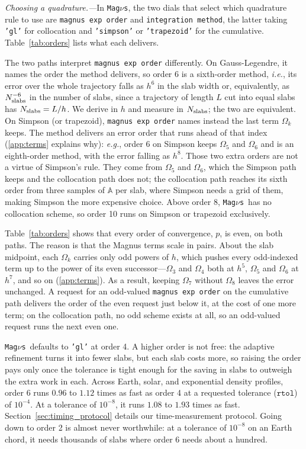 \documentclass[final,5p,times,twocolumn,sort,compress]{elsarticle}
\makeatletter
\newcommand{\ie}{{\it i.e.}}
\newcommand{\eg}{{\it e.g.}}
\DeclareRobustCommand{\_}{%
  \ifmmode\nfss@text{\textunderscore}\else\textunderscore\allowbreak\fi}
\newcommand{\Tab}{Table}
\newcommand{\tabl}[1]{\Tab~\ref{tab:#1}}
\newcommand{\magnus}{{\tt Mag}\ensuremath{\nu}{\tt s}}
\makeatother
\begin{document}
\smallskip

\textit{Choosing a quadrature.---}In \magnus, the two dials that select which quadrature rule to use are {\tt magnus\_exp\_order} and {\tt integration\_method}, the latter taking {\tt 'gl'} for collocation and {\tt 'simpson'} or {\tt 'trapezoid'} for the cumulative. \tabl{orders} lists what each delivers. 

The two paths interpret {\tt magnus\_exp\_order} differently. On Gauss-Legendre, it names the order the method delivers, so order 6 is a sixth-order method, \ie, its error over the whole trajectory falls as $h^{6}$ in the slab width or, equivalently, as $N_{\rm slabs}^{-6}$ in the number of slabs, since a trajectory of length $L$ cut into equal slabs has $N_{\rm slabs} = L/h$. We derive in $h$ and measure in $N_{\rm slabs}$; the two are equivalent. On Simpson (or trapezoid), {\tt magnus\_exp\_order} names instead the last term $\Omega_k$ keeps. The method delivers an error order that runs ahead of that index (\ref{app:terms} explains why): \eg, order 6 on Simpson keeps $\Omega_5$ and $\Omega_6$ and is an eighth-order method, with the error falling as $h^8$. Those two extra orders are not a virtue of Simpson's rule. They come from $\Omega_5$ and $\Omega_6$, which the Simpson path keeps and the collocation path does not; the collocation path reaches its sixth order from three samples of $\mathbb{A}$ per slab, where Simpson needs a grid of them, making Simpson the more expensive choice. Above order 8, \magnus\ has no collocation scheme, so order 10 runs on Simpson or trapezoid exclusively.

\tabl{orders} shows that every order of convergence, $p$, is even, on both paths. The reason is that the Magnus terms scale in pairs. About the slab midpoint, each $\Omega_k$ carries only odd powers of $h$, which pushes every odd-indexed term up to the power of its even successor---$\Omega_3$ and $\Omega_4$ both at $h^{5}$, $\Omega_5$ and $\Omega_6$ at $h^{7}$, and so on (\ref{app:terms}). As a result, keeping $\Omega_7$ without $\Omega_8$ leaves the error unchanged. A request for an odd-valued {\tt magnus\_exp\_order} on the cumulative path delivers the order of the even request just below it, at the cost of one more term; on the collocation path, no odd scheme exists at all, so an odd-valued request runs the next even one.

\magnus\ defaults to {\tt 'gl'} at order 4. A higher order is not free: the adaptive refinement turns it into fewer slabs, but each slab costs more, so raising the order pays only once the tolerance is tight enough for the saving in slabs to outweigh the extra work in each. Across Earth, solar, and exponential density profiles, order 6 runs $0.96$ to $1.12$ times as fast as order 4 at a requested tolerance ($\texttt{rtol}$) of $10^{-4}$. At a tolerance of $10^{-8}$, it runs $1.08$ to $1.93$ times as fast.  Section~\ref{sec:timing_protocol} details our time-measurement protocol. Going down to order 2 is almost never worthwhile: at a tolerance of $10^{-8}$ on an Earth chord, it needs thousands of slabs where order 6 needs about a hundred.
\end{document}
